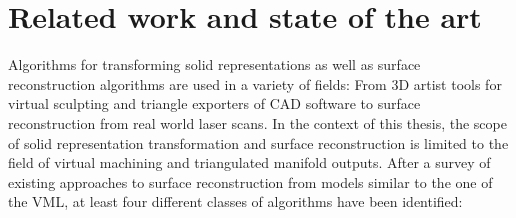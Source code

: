
\chapter{Related work and state of the art}
\label{ch:state_of_the_art}

Algorithms for transforming solid representations as well as surface reconstruction algorithms are used in a variety of fields:
From 3D artist tools for virtual sculpting and triangle exporters of CAD software to surface reconstruction from real world laser scans.
In the context of this thesis, the scope of solid representation transformation and surface reconstruction is limited to the field of virtual machining and triangulated manifold outputs.
After a survey of existing approaches to surface reconstruction from models similar to the one of the VML, at least four different classes of algorithms have been identified:

